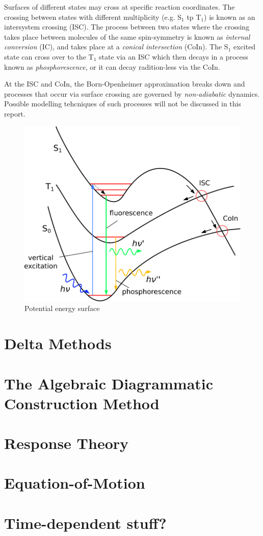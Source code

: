 Surfaces of different states may cross at specific reaction coordinates. The crossing between states with different multiplicity (e.g. S$_1$ tp T$_1$) is known as an intersystem crossing (ISC). The process between two states where the crossing takes place between molecules of the same spin-symmetry is known as \emph{internal conversion} (IC), and takes place at a \emph{conical intersection} (CoIn). The S$_1$ excited state can cross over to the T$_1$ state via an ISC which then decays in a process known as \emph{phosphorescence}, or it can decay radition-less via the CoIn. 

At the ISC and CoIn, the Born-Openheimer approximation breaks down and processes that occur via surface crossing are governed by \emph{non-adiabatic} dynamics. Possible modelling tehcniques of such processes will not be discussed in this report. 

\begin{figure}
\centering
\includegraphics[scale=0.8]{Pics/PESEX}
\caption{Potential energy surface}
\label{fig:PESEX}
\end{figure}

\section{Delta Methods}

\section{The Algebraic Diagrammatic Construction Method}

\section{Response Theory}

\section{Equation-of-Motion}

\section{Time-dependent stuff?}